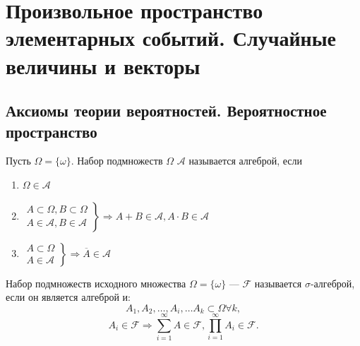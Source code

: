 \chapter{Произвольное пространство элементарных событий. Случайные величины и векторы}
\setcounter{equation}{0}
\section{Аксиомы теории вероятностей. Вероятностное пространство}
\begin{definition}
	Пусть $\Omega = \{\omega\}$. Набор подмножеств $\Omega$ $\mathcal{A}$ называется алгеброй, если
	\begin{enumerate}
		\item $\Omega \in \mathcal{A}$
		\item $\left.
			      \begin{aligned}
				      A \subset \Omega, B \subset \Omega \\
				      A \in \mathcal{A}, B \in \mathcal{A}
			      \end{aligned}
			      \right\} \Rightarrow A + B \in \mathcal{A}, A \cdot B \in \mathcal{A}$
		\item $\left.
			      \begin{aligned}
				      A \subset \Omega \\
				      A \in \mathcal{A}
			      \end{aligned}
			      \right\} \Rightarrow \overline{A} \in \mathcal{A}$
	\end{enumerate}
\end{definition}
\begin{definition}
	Набор подмножеств исходного множества $\Omega = \{\omega\}$ --- $\mathcal{F}$ называется $\sigma$-алгеброй, если он является алгеброй и:
	\[
		A_1, A_2, \dots, A_i, \dots A_k \subset \Omega \forall k,
	\]
	\[
		A_i \in \mathcal{F} \Rightarrow \sum\limits_{i=1}^\infty A \in \mathcal{F}, \prod\limits_{i=1}^\infty A_i \in \mathcal{F}.
	\]
\end{definition}
